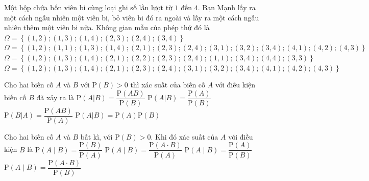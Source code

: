 \begin{ex}%
	Một hộp chứa bốn viên bi cùng loại ghi số lần lượt từ $1$ đến $4$. Bạn Mạnh lấy ra một cách ngẫu nhiên một  viên bi, bỏ viên bi đó ra ngoài và lấy ra một cách ngẫu nhiên thêm một viên bi nữa. Không gian mẫu của phép thử đó là
	 \choice
		 {$\Omega =\left\{\left(1,2\right);\left(1,3\right);\left(1,4\right);\left(2,3\right);\left(2,4\right);\left(3,4\right)\right\}$}
		 {$\Omega =\left\{\left(1,2\right);\left(1,1\right);\left(1,3\right);\left(1,4\right);\left(2,1\right);\left(2,3\right);\left(2,4\right);\left(3,1\right);\left(3,2\right);\left(3,4\right);\left(4,1\right);\left(4,2\right);\left(4,3\right)\right\}$}
		{$\Omega  =\left\{\left(1,2\right);\left(1,3\right);\left(1,4\right);\left(2,1\right);\left(2,2\right);\left(2,3\right);\left(2,4\right);\left(1,1\right);\left(3,4\right);\left(4,4\right);\left(3,3\right)\right\}$}
		 {\True $\Omega =\left\{\left(1,2\right);\left(1,3\right);\left(1,4\right);\left(2,1\right);\left(2,3\right);\left(2,4\right);\left(3,1\right);\left(3,2\right);\left(3,4\right);\left(4,1\right);\left(4,2\right);\left(4,3\right)\right\}$}
\end{ex}

\begin{ex}%
	 Cho hai biến cố $A$ và $B$ với $\mathrm{P}(B)>0$ thì xác suất của biến cố $A$ với điều kiện biến cố $B$ đã xảy ra là
	 \choice
		 {\True $\mathrm{P}(A|B)=\dfrac{\mathrm{P}(AB)}{\mathrm{P}(B)}$}
		 {$\mathrm{P}(A|B)=\dfrac{\mathrm{P}(A)}{\mathrm{P}(B)}$}
		 {$\mathrm{P}(B|A)=\dfrac{\mathrm{P}(AB)}{\mathrm{P}(A)}$}
		{$\mathrm{P}(A|B)=\mathrm{P}(A)\mathrm{P}(B)$} 
\end{ex}

\begin{ex}%
	Cho hai biến cố $A$ và $B$ bất kì, với $\mathrm{P}(B) > 0$. Khi đó xác suất của $A$ với điều kiện $B$  là
	\choice 
		 {$\mathrm{P}(A\mid B)=\dfrac{\mathrm{P}(B)}{\mathrm{P}(A)}$}
		{$\mathrm{P}(A\mid B)=\dfrac{\mathrm{P}(A\cdot  B)}{\mathrm{P}(A)}$}
		{$\mathrm{P}(A\mid  B)=\dfrac{\mathrm{P}(A)}{\mathrm{P}(B)}$}
		 {\True $\mathrm{P}(A\mid B)=\dfrac{\mathrm{P}(A\cdot B)}{\mathrm{P}(B)}$}
\end{ex}


